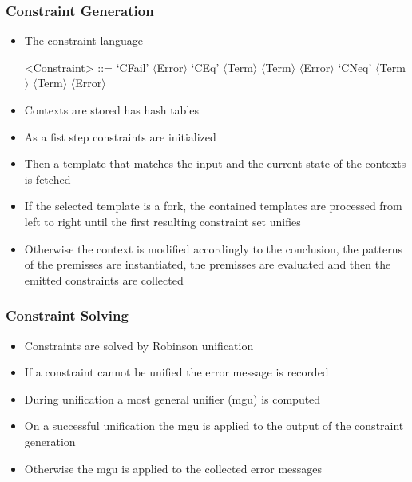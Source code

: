 \documentclass{beamer}
\begin{document}
\begin{frame}
  \frametitle{Constraint Generation}
  \begin{itemize}
  \item The constraint language
  \begin{grammar}
    <Constraint> ::= `CFail' $\langle$Error$\rangle$
    \alt `CEq' $\langle$Term$\rangle$ $\langle$Term$\rangle$ $\langle$Error$\rangle$
    \alt `CNeq' $\langle$Term$\rangle$ $\langle$Term$\rangle$ $\langle$Error$\rangle$
  \end{grammar}
  \item Contexts are stored has hash tables
  \item As a fist step constraints are initialized
  \item Then a template that matches the input and the current state
    of the contexts is fetched
  \item If the selected template is a fork, the contained templates
    are processed from left to right until the first resulting
    constraint set unifies
  \item Otherwise the context is modified accordingly to the
    conclusion, the patterns of the premisses are instantiated, the
    premisses are evaluated and then the emitted constraints are
    collected
  \end{itemize}
\end{frame}

\renewcommand*\selectConstraintSolving{orange}
\renewcommand*\selectConstraintSolving{}

\begin{frame}
  \frametitle{Constraint Solving}
  \begin{itemize}
  \item Constraints are solved by Robinson unification
  \item If a constraint cannot be unified the error message is recorded
  \item During unification a most general unifier (mgu) is computed
  \item On a successful unification the mgu is applied to the output
    of the constraint generation
  \item Otherwise the mgu is applied to the collected error messages
  \end{itemize}
\end{frame}
\end{document}
